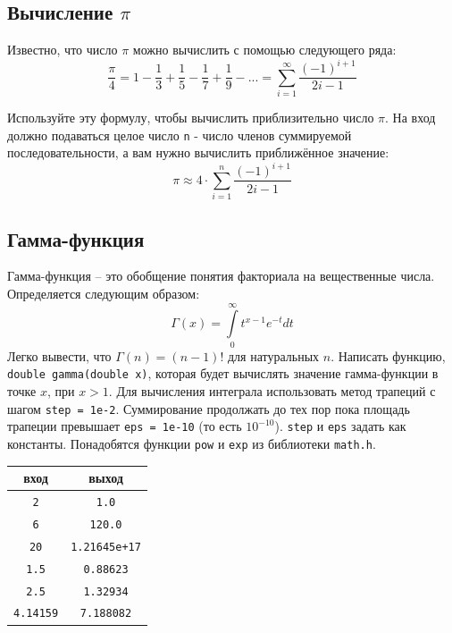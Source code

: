 \documentclass{article}
\begin{document}
\subsection{Вычисление $\pi$} 
Известно, что число $\pi$ можно вычислить с помощью следующего ряда:
$$
\frac{\pi}{4} = 1 - \frac{1}{3} + \frac{1}{5} - \frac{1}{7} + \frac{1}{9} - ... = \sum_{i=1}^{\infty} \frac{(-1)^{i + 1}}{2i-1}
$$

Используйте эту формулу, чтобы вычислить приблизительно число $\pi$. На вход должно подаваться целое число \texttt{n} - число членов суммируемой последовательности, а вам нужно вычислить приближённое значение:
$$
\pi \approx 4 \cdot \sum_{i=1}^{n} \frac{(-1)^{i + 1}}{2i-1}
$$



\subsection{Гамма-функция} 
Гамма-функция -- это обобщение понятия факториала на вещественные числа. Определяется следующим образом:
$$
\Gamma \left( x \right) = \int\limits_0^\infty {t^{x - 1} e^{ - t} dt}
$$
Легко вывести, что $\Gamma(n) = (n - 1)!$ для натуральных $n$. Написать функцию, \texttt{double gamma(double x)}, которая будет вычислять значение гамма-функции в точке $x$, при $x > 1$. Для вычисления интеграла использовать метод трапеций с шагом \texttt{step = 1e-2}. Суммирование продолжать до тех пор пока площадь трапеции превышает \texttt{eps = 1e-10} (то есть $10 ^{-10}$). \texttt{step} и \texttt{eps} задать как константы. Понадобятся функции \texttt{pow} и \texttt{exp} из библиотеки \texttt{math.h}.

\begin{center}
\begin{tabular}{ c c }
 вход & выход \\ \hline
 \texttt{2} & \texttt{1.0}  \\ 
 \texttt{6} & \texttt{120.0}  \\
 \texttt{20} & \texttt{1.21645e+17}  \\
 \texttt{1.5} &        \texttt{0.88623} \\
 \texttt{2.5} &        \texttt{1.32934}\\
 \texttt{4.14159} & \texttt{7.188082}\\
\end{tabular}
\end{center}
\end{document}
